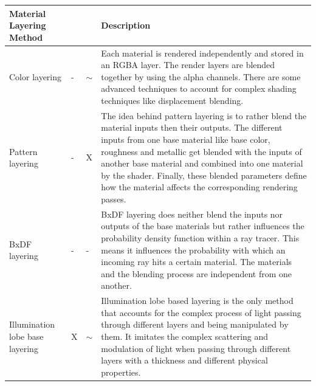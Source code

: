 \begin{table}
	\caption{Overview of the material layering methods.}
	\label{table:materialLayeringSummary}
	\centering
	\begin{longtable}{|p{2.5cm}|p{0.75cm}|p{0.75cm}|p{9cm}|}
		\hline
		\small
		Material Layering Method                          & \rotatebox[origin=c]{90}{Material Coating} & \rotatebox[origin=c]{90}{Game Engine Support} & Description                                                                                                                                                                                                                                                                                                                                                  \\ \hline
		Color layering                  & -       & $\sim$                         & Each material is rendered independently and stored in an RGBA layer. The render layers are blended together by using the alpha channels. There are some advanced techniques to account for complex shading techniques like displacement blending.                                                                                                                                                                                  \\ \hline
		Pattern layering                & -       & X                         & 
		The idea behind pattern layering is to rather blend the material inputs then their outputs. The different inputs from one base material like base color, roughness and metallic get blended with the inputs of another base material and combined into one material by the shader. Finally, these blended parameters define how the material affects the corresponding rendering passes. \\ \hline
		BxDF layering                   & -       & -                         & BxDF layering does neither blend the inputs nor outputs of the base materials but rather influences the probability density function within a ray tracer. This means it influences the probability with which an incoming ray hits a certain material. The materials and the blending process are independent from one another.                                                                                                                \\ \hline
		Illumination lobe base layering & X       & $\sim$                     & Illumination lobe based layering is the only method that accounts for the complex process of light passing through different layers and being manipulated by them. It imitates the complex scattering and modulation of light when passing through different layers with a thickness and different physical properties. \\ \hline
	\end{longtable}
\end{table}

